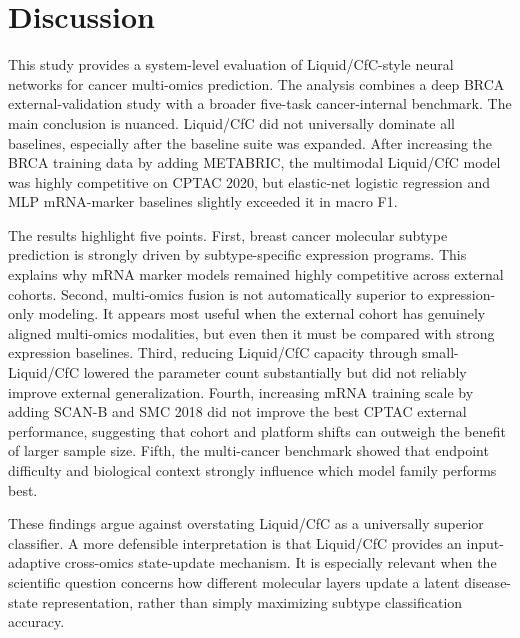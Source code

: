 \section{Discussion}

This study provides a system-level evaluation of Liquid/CfC-style neural networks for cancer multi-omics prediction. The analysis combines a deep BRCA external-validation study with a broader five-task cancer-internal benchmark. The main conclusion is nuanced. Liquid/CfC did not universally dominate all baselines, especially after the baseline suite was expanded. After increasing the BRCA training data by adding METABRIC, the multimodal Liquid/CfC model was highly competitive on CPTAC 2020, but elastic-net logistic regression and MLP mRNA-marker baselines slightly exceeded it in macro F1.

The results highlight five points. First, breast cancer molecular subtype prediction is strongly driven by subtype-specific expression programs. This explains why mRNA marker models remained highly competitive across external cohorts. Second, multi-omics fusion is not automatically superior to expression-only modeling. It appears most useful when the external cohort has genuinely aligned multi-omics modalities, but even then it must be compared with strong expression baselines. Third, reducing Liquid/CfC capacity through small-Liquid/CfC lowered the parameter count substantially but did not reliably improve external generalization. Fourth, increasing mRNA training scale by adding SCAN-B and SMC 2018 did not improve the best CPTAC external performance, suggesting that cohort and platform shifts can outweigh the benefit of larger sample size. Fifth, the multi-cancer benchmark showed that endpoint difficulty and biological context strongly influence which model family performs best.

These findings argue against overstating Liquid/CfC as a universally superior classifier. A more defensible interpretation is that Liquid/CfC provides an input-adaptive cross-omics state-update mechanism. It is especially relevant when the scientific question concerns how different molecular layers update a latent disease-state representation, rather than simply maximizing subtype classification accuracy.


